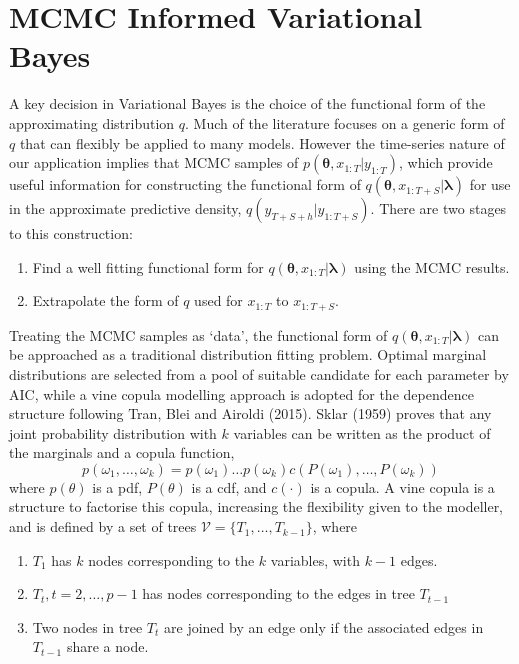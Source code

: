 \documentclass[12pt,a4paper]{article}%
\numberwithin{equation}{section}
\begin{document}
\section{MCMC Informed Variational Bayes}
\label{CopulaVB}

A key decision in Variational Bayes is the choice of the functional form of the approximating distribution $q$. Much of the literature focuses on a generic form of $q$ that can flexibly be applied to many models. However the time-series nature of our application implies that MCMC samples of $p(\boldsymbol{\theta}, x_{1:T} | y_{1:T})$, which provide useful information for constructing the functional form of $q(\boldsymbol{\theta}, x_{1:T+S} | \boldsymbol{\lambda})$ for use in the approximate predictive density, $q(y_{T+S+h} | y_{1:T+S})$. There are two stages to this construction:
\begin{enumerate}
\item Find a well fitting functional form for $q(\boldsymbol{\theta}, x_{1:T} | \boldsymbol{\lambda})$ using the MCMC results.
\item Extrapolate the form of $q$ used for $x_{1:T}$ to $x_{1:T+S}$.
\end{enumerate}
Treating the MCMC samples as `data', the functional form of $q(\boldsymbol{\theta}, x_{1:T} | \boldsymbol{\lambda})$ can be approached as a traditional distribution fitting problem. Optimal marginal distributions are selected from a pool of suitable candidate for each parameter by AIC, while a vine copula modelling approach is adopted for the dependence structure following Tran, Blei and Airoldi (2015). Sklar (1959) proves that any joint probability distribution with $k$ variables can be written as the product of the marginals and a copula function,
\begin{equation}
\label{vc1}
p(\omega_1, \dots, \omega_k) = p(\omega_1) \dots p(\omega_k) c(P(\omega_1), \dots, P(\omega_k))
\end{equation}
where $p(\theta)$ is a pdf, $P(\theta)$ is a cdf, and $c(\cdot)$ is a copula. A vine copula is a structure to factorise this copula, increasing the flexibility given to the modeller, and is defined by a set of trees $\mathcal{V} = \{T_1, \dots, T_{k-1} \}$, where
\begin{enumerate}
\item $T_1$ has $k$ nodes corresponding to the $k$ variables, with $k-1$ edges.
\item $T_t, t = 2, \dots, p-1$ has nodes corresponding to the edges in tree $T_{t-1}$
\item Two nodes in tree $T_t$ are joined by an edge only if the associated edges in $T_{t-1}$ share a node. 
\end{enumerate}
\end{document}
